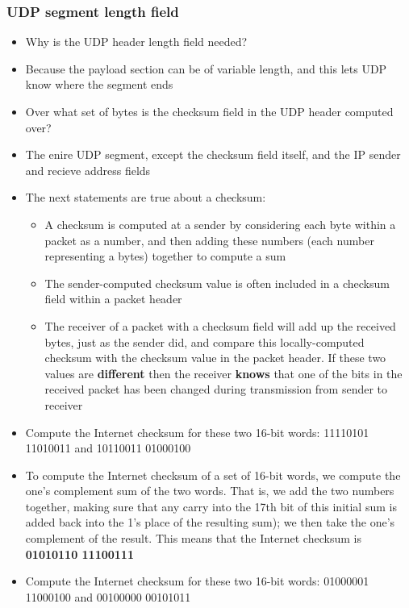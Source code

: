     \subsubsection*{UDP segment length field}
    \begin{itemize}
        \item Why is the UDP header length field needed?
        \item[] Because the payload section can be of variable length, and this lets UDP know where the segment ends
        \item Over what set of bytes is the checksum field in the UDP header computed over?
        \item[] The enire UDP segment, except the checksum field itself, and the IP sender and recieve address fields
        \item The next statements are true about a checksum:
        \begin{itemize}
            \item A checksum is computed at a sender by considering each byte within a packet as a number, and then
            adding these numbers (each number representing a bytes) together to compute a sum
            \item The sender-computed checksum value is often included in a checksum field within a packet header
            \item The receiver of a packet with a checksum field will add up the received bytes, just as the sender did,
            and compare this locally-computed checksum with the checksum value in the packet header. If these two
            values are \textbf{different} then the receiver \textbf{knows} that one of the bits in the received packet
            has been changed during transmission from sender to receiver
        \end{itemize}
        \item Compute the Internet checksum for these two 16-bit words: 11110101 11010011 and 10110011 01000100
        \item[] To compute the Internet checksum of a set of 16-bit words, we compute the one's complement sum 
        of the two words. That is, we add the two numbers together, making sure that any carry into the 17th bit
        of this initial sum is added back into the 1's place of the resulting sum); we then take the one's
        complement of the result. This means that the Internet checksum is \textbf{01010110 11100111}
        \item Compute the Internet checksum for these two 16-bit words: 01000001 11000100 and 00100000 00101011

\end{itemize}
